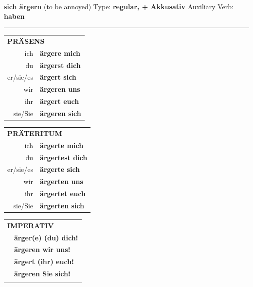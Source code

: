 \documentclass[10pt,a4paper]{revtex4-2}
\begin{document}
\begin{verbbox-acc}
        {\Large \bf sich ärgern} (to be annoyed) \hfill Type: \textbf{regular, + Akkusativ} \hfill Auxiliary Verb: \textbf{haben} 
    
       \vspace{5pt}

    \hrule
    
    \vspace{5pt}

  \begin{tabular}{rl}
     \multicolumn{2}{l}{\textbf{PRÄSENS} }\\
    ich & \textbf{ärgere mich}\\
    du & \textbf{ärgerst dich}\\
    er/sie/es & \textbf{ärgert sich}\\
    wir & \textbf{ärgeren uns}\\
    ihr & \textbf{ärgert euch}\\
    sie/Sie & \textbf{ärgeren sich}\\
  \end{tabular}
  \hfill
     \begin{tabular}{rl}
    \multicolumn{2}{l}{\textbf{PRÄTERITUM} }\\
    ich & \textbf{ärgerte mich}\\
    du & \textbf{ärgertest dich}\\
    er/sie/es & \textbf{ärgerte sich}\\
    wir & \textbf{ärgerten uns}\\
    ihr & \textbf{ärgertet euch}\\
    sie/Sie & \textbf{ärgerten sich}\\
  \end{tabular}
  \hfill
  \begin{tabular}{rl}
     \multicolumn{2}{l}{\textbf{IMPERATIV} }\\
   & \textbf{ärger(e) (du) dich!}\\
   & \textbf{ärgeren wir uns!}\\
   & \textbf{ärgert (ihr) euch!}\\
   & \textbf{ärgeren Sie sich!}\\
   & \vspace{10pt}
  \end{tabular}

    \vspace{10pt}


\end{verbbox-acc}
\end{document}
